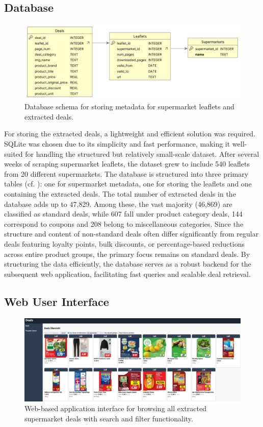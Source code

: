 \documentclass[11pt]{article}
\begin{document}
\subsection{Database}
\begin{figure}[h!]
    \centering
    \includegraphics[width=0.8\linewidth]{figures/application/db_uml.png}
    \caption{Database schema for storing metadata for supermarket leaflets and extracted deals.}
    \label{fig:application_db_uml}
\end{figure}
For storing the extracted deals, a lightweight and efficient solution was required. SQLite was chosen due to its simplicity and fast performance, making it well-suited for handling the structured but relatively small-scale dataset. After several weeks of scraping supermarket leaflets, the dataset grew to include 540 leaflets from 20 different supermarkets. The database is structured into three primary tables (cf. ): one for supermarket metadata, one for storing the leaflets and one containing the extracted deals. The total number of extracted deals in the database adds up to 47,829. Among these, the vast majority (46,869) are classified as standard deals, while 607 fall under product category deals, 144 correspond to coupons and 208 belong to miscellaneous categories. Since the structure and content of non-standard deals often differ significantly from regular deals featuring loyalty points, bulk discounts, or percentage-based reductions across entire product groups, the primary focus remains on standard deals. By structuring the data efficiently, the database serves as a robust backend for the subsequent web application, facilitating fast queries and scalable deal retrieval.

\subsection{Web User Interface}
\begin{figure}[h!]
    \centering
    \includegraphics[width=0.8\linewidth]{figures/application/deals_overview.png}
    \caption{Web-based application interface for browsing all extracted supermarket deals with search and filter functionality.}
    \label{fig:application_web_overview}
\end{figure}
\end{document}
